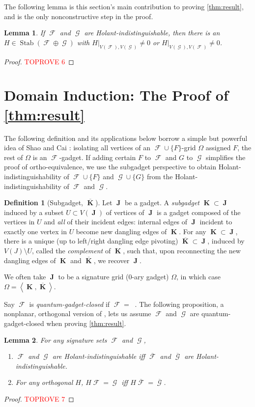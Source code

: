 \documentclass{article}
\newtheorem{lemma}{Lemma}[section]
\theoremstyle{remark}
\theoremstyle{definition}
\newtheorem{definition}{Definition}[section]
\DeclareMathOperator{\vk}{\mathbf{K}}
\DeclareMathOperator{\vj}{\mathbf{J}}
\DeclareMathOperator{\fc}{\mathcal{F}}
\DeclareMathOperator{\gc}{\mathcal{G}}
\DeclareMathOperator{\ofc}{\overline{\fc}}
\DeclareMathOperator{\stab}{Stab}
\begin{document}
The following lemma is this section's main contribution to proving \autoref{thm:result}, and is the
only nonconstructive step in the proof.
\begin{lemma}
    If $\fc$ and $\gc$ are Holant-indistinguishable, then there is an
    $H \in \stab(\fc \oplus \gc)$ with $H|_{V(\fc),V(\gc)} \neq 0$ or $H|_{V(\gc),V(\fc)} \neq 0$.
    \label{lem:offdiagblock}
\end{lemma}
\begin{proof}\textcolor{red}{TOPROVE 6}\end{proof}
 \section{Domain Induction: The Proof of \autoref{thm:result}}
The following definition and its applications below borrow a simple but powerful idea of Shao and
Cai \cite[Section 8.2]{shao}: isolating all vertices of an
$\fc \cup \{F\}$-grid $\Omega$ assigned $F$, the rest of $\Omega$ is an $\fc$-gadget. 
If adding certain $F$ to $\fc$ and $G$ to $\gc$ simplifies the proof of ortho-equivalence,
we use the subgadget perspective to obtain Holant-indistinguishability of $\fc\cup\{F\}$
and $\gc\cup\{G\}$ from the Holant-indistinguishability of $\fc$ and $\gc$.
\begin{definition}[Subgadget, $\overline{\vk}$]
    Let $\vj$ be a gadget. A \emph{subgadget} $\vk \subset \vj$ induced by a subset $U \subset V(\vj)$ 
    of vertices of $\vj$ is a gadget composed of the vertices in $U$ and 
    \emph{all} of their incident edges: internal edges of $\vj$ incident to 
    exactly one vertex in $U$ become new dangling edges of $\vk$.
    For any $\vk \subset \vj$, there is a
    unique (up to left/right dangling edge pivoting) $\overline{\vk} \subset\vj$, induced by $V(J) \setminus U$, called the 
    \emph{complement} of $\vk$, such that, upon reconnecting the new dangling edges of $\vk$ and
    $\overline{\vk}$, we recover $\vj$.

    We often take $\vj$ to be a signature grid (0-ary gadget) $\Omega$, in which case
    $\Omega = \left\langle \vk,\overline{\vk} \right\rangle$.
\end{definition}

Say $\fc$ is \emph{quantum-gadget-closed} if $\fc = \ofc$. The following proposition, a
nonplanar, orthogonal version of \cite[Lemmas 31 and 32]{cai_planar_2023}, lets us assume
$\fc$ and $\gc$ are quantum-gadget-closed when proving \autoref{thm:result}.
\begin{lemma}
    \label{prop:closure}
    For any signature sets $\fc$ and $\gc$,
    \begin{enumerate}
        \item $\fc$ and $\gc$ are Holant-indistinguishable iff $\overline{\fc}$ and $\overline{\gc}$ are
            Holant-indistinguishable.
        \item For any orthogonal $H$, $H\fc = \gc$ iff $H\overline{\fc} = \overline{\gc}$.
    \end{enumerate}
\end{lemma}
\begin{proof}\textcolor{red}{TOPROVE 7}\end{proof}
\end{document}
